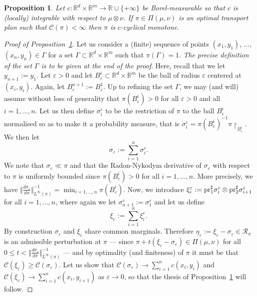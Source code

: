 \documentclass[leqno, 11pt, a4paper]{amsart}
\newtheorem{prop}{Proposition}
\theoremstyle{definition}
\newcommand{\cR}{\mathcal{R}}
\newcommand{\R}{\mathbb{R}}
\newcommand{\C}{\mathscr{C}}
\newcommand{\eps}{\varepsilon}
\newcommand{\pr}{{\rm pr}}
\newcommand{\extendedR}{\R \cup \{+\infty\}}
\begin{document}
\begin{prop}\label{prop:necessary-euclidean}
	Let $c : \R^d \times \R^m \to \extendedR$ be Borel-measurable so that $c$ is (locally) integrable with respect to $\mu \otimes \nu$. If $\pi \in \Pi(\mu, \nu)$ is an optimal transport plan such that $\C(\pi) < \infty$ then $\pi$ is $c$-cyclical monotone.
\end{prop}
\begin{proof}[Proof of Proposition~\ref{prop:necessary-euclidean}]
	Let us consider a (finite) sequence of points $(x_1, y_1)$, ...,$(x_n, y_n) \in \Gamma$ for a set $\Gamma \subset \R^d \times \R^m$ such that $\pi(\Gamma) = 1$.  \textit{The precise definition of the set $\Gamma$ is to be given at the end of the proof}. Here, recall that we let $y_{n+1} := y_1$. Let $\eps > 0$ and let $B_\eps^i \subset \R^d \times \R^m$ be the ball of radius $\eps$ centered at $(x_i, y_i)$. Again, let $B_\eps^{n+1} := B_\eps^1$. Up to refining the set $\Gamma$, we may (and will) assume without loss of generality that $\pi(B_\eps^i) > 0$ for all $\eps > 0$ and all $i =1, \dots, n$. Let us then define $\sigma_i^\eps$ to be the restriction of $\pi$ to the ball $B_\eps^i$ normalised so as to make it a probability measure, that is $\sigma_i^\eps = \pi(B_\eps^i)^{-1} \pi \restriction_{B_\eps^i}$. We then let $$\sigma_\eps := \sum_{ i = 1}^n \sigma_i^\eps.$$  We note that $\sigma_\eps \ll \pi$ and that the Radon-Nykodym derivative of $\sigma_\eps$ with respect to $\pi$ is uniformly bounded since $\pi(B_\eps^i) > 0$ for all $i = 1, \dots, n$. More precisely, we have $\Vert \frac{d \sigma_\eps}{d \pi} \Vert_{L^\infty(\pi)}^{-1} = \min_{i = 1, \dots, n} \pi(B_\eps^i)$. Now, we introduce $\xi_i^\eps := \pr_1^\sharp \sigma_i^\eps \otimes \pr_2^\sharp \sigma_{i+1}^\eps$ for all $i = 1, \dots, n$, where again we let $\sigma_{n+1}^\eps := \sigma_1^\eps$ and let us define $$\xi_\eps := \sum_{i =1}^n \xi_i^\eps.$$ By construction $\sigma_\eps$ and $\xi_\eps$ share common marginals. Therefore $\eta_\eps := \xi_\eps - \sigma_\eps \in \cR_\pi$ is an admissible perturbation at $\pi$  --- since $\pi + t(\xi_\eps - \sigma_\eps) \in \Pi(\mu, \nu)$ for all $0 \leq t < \Vert \frac{d \sigma_\eps}{d \pi} \Vert^{-1}_{L^\infty(\pi)}$  --- and by optimality (and finiteness) of $\pi$ it must be that $\C(\xi_\eps) \geq \C(\sigma_\eps)$. Let us show that $\C(\sigma_\eps) \to \sum_{i = 1}^n c(x_i, y_i)$ and $\C(\xi_\eps) \to \sum_{i = 1}^n c(x_i, y_{i+1})$ as $\eps \to 0$, so that the thesis of Proposition~\ref{prop:necessary-euclidean} will follow. 
	

\end{proof}
\end{document}
